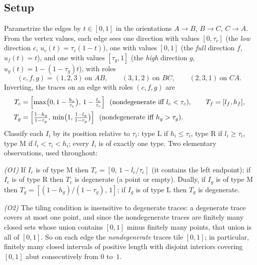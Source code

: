 \documentclass[11pt,reqno]{amsart}
\theoremstyle{plain}
\theoremstyle{definition}
\theoremstyle{remark}
\begin{document}
\subsection*{Setup}
Parametrize the edges by $t\in[0,1]$ in the orientations $A\!\to\!B$,
$B\!\to\!C$, $C\!\to\!A$. From the vertex values, each edge sees one direction
with values $[0,\tau_c]$ (the \emph{low} direction $c$, $u_c(t)=\tau_c(1-t)$),
one with values $[0,1]$ (the \emph{full} direction $f$, $u_f(t)=t$), and one
with values $[\tau_g,1]$ (the \emph{high} direction $g$,
$u_g(t)=1-(1-\tau_g)t$), with roles
\[
(c,f,g)=(1,2,3)\ \text{on } AB,\qquad (3,1,2)\ \text{on } BC,\qquad
(2,3,1)\ \text{on } CA .
\]
Inverting, the traces on an edge with roles $(c,f,g)$ are
\begin{equation}\label{eq:traces}
\begin{aligned}
T_c&=\Bigl[\max\bigl(0,1-\tfrac{h_c}{\tau_c}\bigr),\,1-\tfrac{l_c}{\tau_c}\Bigr]
\ \ (\text{nondegenerate iff }l_c<\tau_c),\qquad T_f=[l_f,h_f],\\
T_g&=\Bigl[\tfrac{1-h_g}{1-\tau_g},\,
\min\bigl(1,\tfrac{1-l_g}{1-\tau_g}\bigr)\Bigr]
\ \ (\text{nondegenerate iff }h_g>\tau_g).
\end{aligned}
\end{equation}
Classify each $I_i$ by its position relative to $\tau_i$: type $\mathrm L$ if
$h_i\le\tau_i$, type $\mathrm R$ if $l_i\ge\tau_i$, type $\mathrm M$ if
$l_i<\tau_i<h_i$; every $I_i$ is of exactly one type. Two elementary
observations, used throughout:

\emph{(O1)} If $I_c$ is of type $\mathrm M$ then $T_c=[0,\,1-l_c/\tau_c]$ (it
contains the left endpoint); if $I_c$ is of type $\mathrm R$ then $T_c$ is
degenerate (a point or empty). Dually, if $I_g$ is of type $\mathrm M$ then
$T_g=[(1-h_g)/(1-\tau_g),\,1]$; if $I_g$ is of type $\mathrm L$ then $T_g$ is
degenerate.

\emph{(O2)} The tiling condition is insensitive to degenerate traces: a
degenerate trace covers at most one point, and since the nondegenerate traces
are finitely many closed sets whose union contains $[0,1]$ minus finitely many
points, that union is all of $[0,1]$. So on each edge the \emph{nondegenerate}
traces tile $[0,1]$; in particular, finitely many closed intervals of positive
length with disjoint interiors covering $[0,1]$ abut consecutively from $0$
to~$1$.
\end{document}
